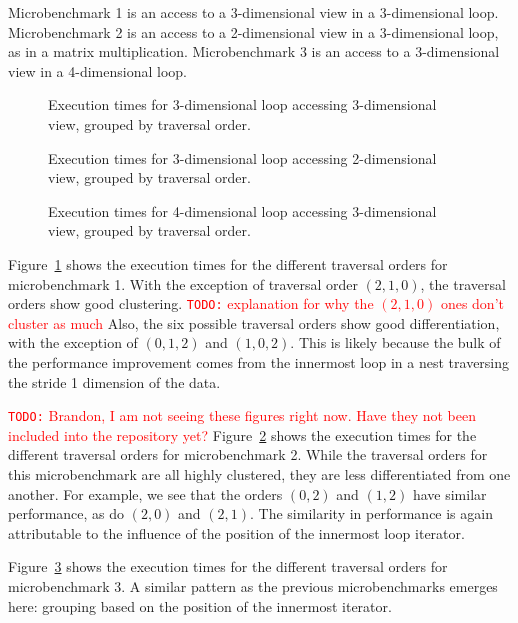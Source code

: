 \documentclass[sigconf, table]{acmart}
\newcommand{\todo}[1]{{\textcolor{red}{{\tt{TODO:}}\,\,#1 }}}
\begin{document}
Microbenchmark 1 is an access to a 3-dimensional view in a 3-dimensional loop. 
Microbenchmark 2 is an access to a 2-dimensional view in a 3-dimensional loop, as in a matrix multiplication.
Microbenchmark 3 is an access to a 3-dimensional view in a 4-dimensional loop.


\begin{figure}
\caption{Execution times for 3-dimensional loop accessing 3-dimensional view, grouped by traversal order.}
\label{TraversalBenchmark1}
\end{figure}

\begin{figure}
	\caption{Execution times for 3-dimensional loop accessing 2-dimensional view, grouped by traversal order.}
	\label{TraversalBenchmark2}
\end{figure}

\begin{figure}
	\caption{Execution times for 4-dimensional loop accessing 3-dimensional view, grouped by traversal order.}
	\label{TraversalBenchmark3}
\end{figure}

Figure~\ref{TraversalBenchmark1} shows the execution times for the different traversal orders for microbenchmark 1. 
With the exception of traversal order $(2,1,0)$, the traversal orders show good clustering.
\todo{explanation for why the $(2,1,0)$ ones don't cluster as much}
Also, the six possible traversal orders show good differentiation, with the exception of $(0,1,2)$ and $(1,0,2)$. 
This is likely because the bulk of the performance improvement comes from the innermost loop in a nest traversing the stride 1 dimension of the data.


\todo{Brandon, I am not seeing these figures right now.  Have they not been included into the repository yet?}
Figure~\ref{TraversalBenchmark2} shows the execution times for the different traversal orders for microbenchmark 2. 
While the traversal orders for this microbenchmark are all highly clustered, they are less differentiated from one another. 
For example, we see that the orders $(0,2)$ and $(1,2)$ have similar performance, as do $(2,0)$ and $(2,1)$. 
The similarity in performance is again attributable to the influence of the position of the innermost loop iterator. 



Figure~\ref{TraversalBenchmark3} shows the execution times for the different traversal orders for microbenchmark 3. 
A similar pattern as the previous microbenchmarks emerges here: grouping based on the position of the innermost iterator. 
\end{document}

